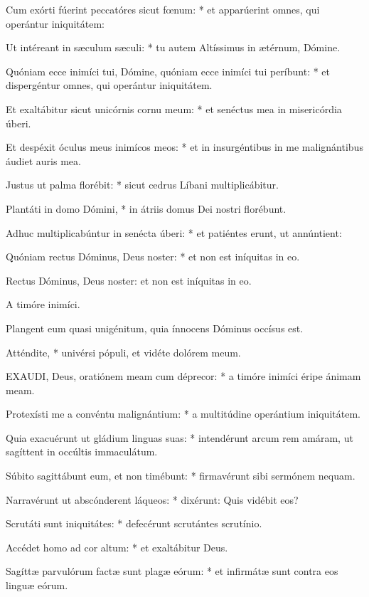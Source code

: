 Cum exórti fúerint peccatóres sicut fœnum: * et apparúerint omnes, qui operántur iniquitátem:

Ut intéreant in sæculum sæculi: * tu autem Altíssimus in ætérnum, Dómine.

Quóniam ecce inimíci tui, Dómine, quóniam ecce inimíci tui períbunt: * et dispergéntur omnes, qui operántur iniquitátem.

Et exaltábitur sicut unicórnis cornu meum: * et senéctus mea in misericórdia úberi.

Et despéxit óculus meus inimícos meos: * et in insurgéntibus in me malignántibus áudiet auris mea.

Justus ut palma florébit: * sicut cedrus Líbani multiplicábitur.

Plantáti in domo Dómini, * in átriis domus Dei nostri florébunt.

Adhuc multiplicabúntur in senécta úberi: * et patiéntes erunt, ut annúntient:

Quóniam rectus Dóminus, Deus noster: * et non est iníquitas in eo.

 Rectus Dóminus, Deus noster: et non est iníquitas in eo.

 A timóre inimíci.


 Plangent eum quasi unigénitum, quia ínnocens Dóminus occísus est.

 Atténdite, * univérsi pópuli, et vidéte dolórem meum.


\lettrine[lines=2]{E}{XAUDI}, Deus, oratiónem meam cum déprecor: * a timóre inimíci éripe ánimam meam.

Protexísti me a convéntu malignántium: * a multitúdine operántium iniquitátem.

Quia exacuérunt ut gládium linguas suas: * intendérunt arcum rem amáram, ut sagíttent in occúltis immaculátum.

Súbito sagittábunt eum, et non timébunt: * firmavérunt sibi sermónem nequam.

Narravérunt ut abscónderent láqueos: * dixérunt: Quis vidébit eos?

Scrutáti sunt iniquitátes: * defecérunt scrutántes scrutínio.

Accédet homo ad cor altum: * et exaltábitur Deus.

Sagíttæ parvulórum factæ sunt plagæ eórum: * et infirmátæ sunt contra eos linguæ eórum.

